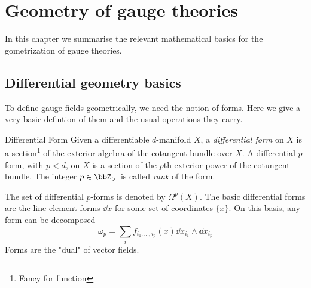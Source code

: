\chapter{Geometry of gauge theories}
In this chapter we summarise the relevant mathematical basics for the gometrization of gauge theories. 
\section{Differential geometry basics}
To define gauge fields geometrically, we need the notion of forms. Here we give a very basic defintion of them and the usual operations they carry. 

\begin{defn}{Differential Form}{}
    Given a differentiable $d$-manifold $X$, a \textit{differential form} on $X$ is a section\footnote{Fancy for function} of the exterior algebra of the cotangent bundle over $X$. A differential $p$-form, with $p<d$, on $X$ is a section of the $p$th exterior power of the cotungent bundle. The integer $p\in\bbZ_{>}$ is called \textit{rank} of the form.
\end{defn}

The set of differential $p$-forms is denoted by $\Omega^p(X)$. The basic differential forms are the line element forms $\dd{x}$ for some set of coordinates $\{x\}$. On this basis, any form can be decomposed 
\begin{equation}
    \omega_p=\sum_if_{i_1,\ldots,i_p}(x)\dd{x_{i_1}}\wedge\dd{x_{i_p}}
\end{equation}
Forms are the "dual" of vector fields.